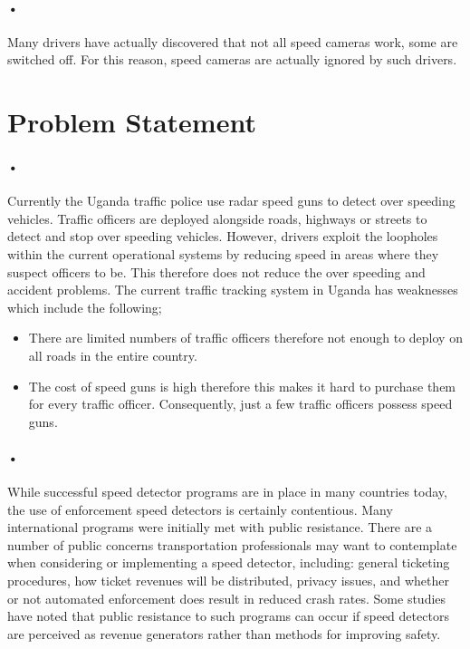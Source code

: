 \documentclass[12pt]{report}
\begin{document}
\paragraph{•}
Many drivers have actually discovered that not all speed cameras work, some are switched off. For this reason, speed cameras are actually ignored by such drivers.

\section{Problem Statement}
\paragraph{•}
Currently the Uganda traffic police use radar speed guns to detect over speeding vehicles. Traffic officers are deployed alongside roads, highways or streets to detect and stop over speeding vehicles. However, drivers exploit the loopholes within the current operational systems by reducing speed in areas where they suspect officers to be. This therefore does not reduce the over speeding and accident problems. The current traffic tracking system in Uganda has weaknesses which include the following;
\begin{itemize}
\item There are limited numbers of traffic officers therefore not enough to deploy on all roads in the entire country.
\item The cost of speed guns is high therefore this makes it hard to purchase them for every traffic officer. Consequently, just a few traffic officers possess speed guns. \cite{mukreport}
\end{itemize}
\paragraph{•}
While successful speed detector programs are in place in many countries today, the use of enforcement speed detectors is certainly contentious. Many international programs were initially met with public resistance. There are a number of public concerns transportation professionals may want to contemplate when considering or implementing a speed detector, including: general ticketing procedures, how ticket revenues will be distributed, privacy issues, and whether or not automated enforcement does result in reduced crash rates. Some studies have noted that public resistance to such programs can occur if speed detectors are perceived as revenue generators rather than methods for improving safety.
\end{document}
